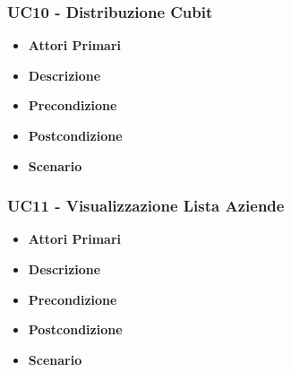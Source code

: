 \subsubsection{UC10 - Distribuzione Cubit}
\begin{itemize}
	\item \textbf{Attori Primari}
	\item \textbf{Descrizione}
	\item \textbf{Precondizione}
	\item \textbf{Postcondizione}
	\item \textbf{Scenario}
\end{itemize}
\subsubsection{UC11 - Visualizzazione Lista Aziende}
\begin{itemize}
	\item \textbf{Attori Primari}
	\item \textbf{Descrizione}
	\item \textbf{Precondizione}
	\item \textbf{Postcondizione}
	\item \textbf{Scenario}
\end{itemize}

